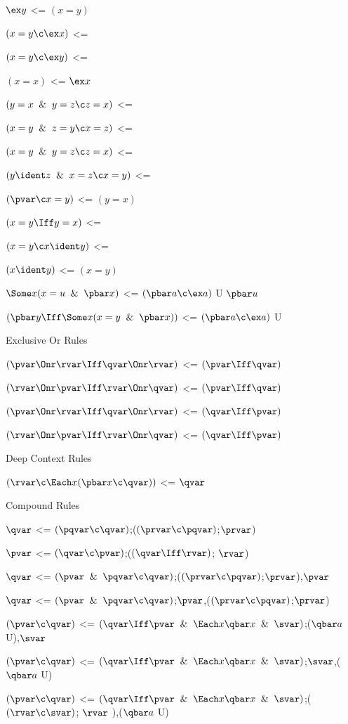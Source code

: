 $\ex y$ <= $(x = y)$

$(x = y \c \ex x)$ <=

$(x = y \c \ex y)$ <=

$(x = x)$ <= $\ex x$

$(y = x\And y = z \c z = x)$ <=

$(x = y\And z = y \c x = z)$ <=

$(x = y \And y = z \c z = x)$ <=

$(y \ident z \And x = z \c x = y)$ <=

$(\pvar \c x = y)$ <= $(y = x)$

$(x = y \Iff  y = x)$ <=

$(x = y \c  x \ident y)$ <=

$(x \ident y)$ <= $(x = y)$

$\Some x (x = u \And  \pbar x)$ <= $(\pbar a \c \ex a)$ U $\pbar u$

$(\pbar y \Iff \Some x (x = y \And  \pbar x))$ <= $(\pbar a \c \ex a)$ U 
\lineb

Exclusive Or Rules

$(\pvar \Onr \rvar \Iff \qvar \Onr \rvar)$ <= $(\pvar \Iff \qvar)$

$(\rvar \Onr \pvar \Iff \rvar \Onr \qvar)$ <= $(\pvar \Iff \qvar)$

$(\pvar \Onr \rvar \Iff \qvar \Onr \rvar)$ <= $(\qvar \Iff \pvar)$

$(\rvar \Onr \pvar \Iff \rvar \Onr \qvar)$ <= $(\qvar \Iff \pvar)$
\lineb

Deep Context Rules

$(\rvar \c \Each x (\pbar x \c \qvar))$ <= $\qvar$
\lineb

Compound Rules 
\lineb

$\qvar$ <= $(\pqvar \c \qvar)$;($(\prvar \c \pqvar)$;$\prvar$)

$\pvar$ <=  $(\qvar \c \pvar)$;($(\qvar \Iff \rvar)$; $\rvar$)

$\qvar$ <= $(\pvar \And \pqvar \c \qvar)$;($(\prvar \c \pqvar)$;$\prvar$),$\pvar$

$\qvar$ <= $(\pvar \And \pqvar \c \qvar)$;$\pvar$,($(\prvar \c \pqvar)$;$\prvar$)

$(\pvar \c \qvar )$ <= $(\qvar \Iff \pvar \And\Each x \qbar x \And \svar)$;($\qbar a$ U),$\svar$ 

$(\pvar \c \qvar )$ <= $(\qvar \Iff \pvar \And\Each x \qbar x \And \svar)$;$\svar$,($\qbar a$ U)

$(\pvar \c \qvar )$ <= $(\qvar \Iff \pvar \And\Each x \qbar x \And \svar)$;($(\rvar \c \svar)$; $\rvar$ ),($\qbar a$ U)

